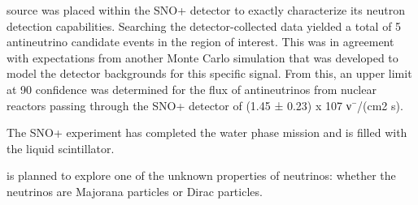  source was placed
within the SNO+ detector to exactly characterize its neutron detection capabilities. Searching the detector-collected data yielded a total of 5 antineutrino
candidate events in the region of interest. This was in agreement with expectations from another Monte Carlo simulation that was developed to model the
detector backgrounds for this specific signal. From this, an upper limit at 90%
confidence was determined for the flux of antineutrinos from nuclear reactors
passing through the SNO+ detector of (1.45 ± 0.23) x 107 ν¯/(cm2 s).


The SNO+ experiment has completed the water phase mission and is filled with the liquid scintillator.


is planned to explore one of the unknown properties of neutrinos: whether the neutrinos are Majorana particles or Dirac particles.

